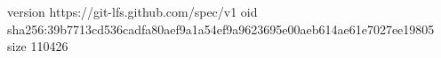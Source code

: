 version https://git-lfs.github.com/spec/v1
oid sha256:39b7713cd536cadfa80aef9a1a54ef9a9623695e00aeb614ae61e7027ee19805
size 110426
